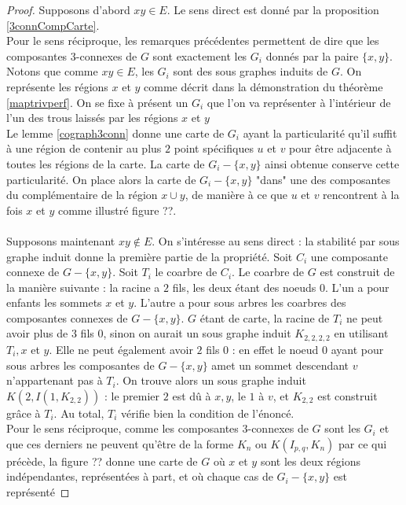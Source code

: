 \documentclass{scrartcl}
\begin{document}
\begin{flushleft}
\begin{proof}
    Supposons d'abord $xy \in E$. Le sens direct est donné par la proposition \ref{3connCompCarte}.\\
    Pour le sens réciproque, les remarques précédentes permettent de dire
    que les composantes $3$-connexes de $G$ sont exactement les $G_i$ donnés par la paire $\{x,y\}$. Notons que comme $xy \in E$, les $G_i$
    sont des sous graphes induits de $G$. On représente les régions $x$ et $y$ comme décrit dans la démonstration du théorème \ref{maptrivperf}.
    On se fixe à présent un $G_i$ que l'on va représenter à l'intérieur de l'un des trous laissés par les régions $x$ et $y$\\
    Le lemme \ref{cograph3conn} donne une carte de $G_i$ ayant la particularité qu'il suffit à une région de contenir au plus $2$ point spécifiques
    $u$ et $v$ pour être adjacente à toutes les régions de la carte. La carte de $G_i - \{x,y\}$ ainsi obtenue conserve cette particularité. On place alors
    la carte de $G_i - \{x,y\}$ "dans" une des composantes du complémentaire de la région $x \cup y$, de manière à ce que $u$ et $v$ rencontrent à la fois
    $x$ et $y$ comme illustré figure ??.
    \\~\\
    Supposons maintenant $xy \notin E$. On s'intéresse au sens direct : la stabilité par sous graphe induit donne la première partie de la propriété.
    Soit $C_i$ une composante connexe de $G - \{x,y\}$. Soit $T_i$ le coarbre de $C_i$.
    Le coarbre de $G$ est construit de la manière suivante : la racine a $2$ fils, les deux étant des noeuds $0$. L'un a pour enfants les sommets
    $x$ et $y$. L'autre a pour sous arbres les coarbres des composantes connexes de $G - \{x,y\}$. $G$ étant de carte, la racine de $T_i$
    ne peut avoir plus de $3$ fils $0$, sinon on aurait un sous graphe induit $K_{2,2,2,2}$ en utilisant $T_i, x$ et $y$. Elle ne peut également avoir $2$
    fils $0$ : en effet le noeud $0$ ayant pour sous arbres les composantes de $G - \{x,y\}$ amet un sommet descendant $v$ n'appartenant pas à $T_i$.
    On trouve alors un sous graphe induit $K(2, I(1, K_{2,2}))$ : le premier $2$ est dû à $x,y$, le $1$ à $v$, et $K_{2,2}$ est construit grâce à
    $T_i$. Au total, $T_i$ vérifie bien la condition de l'énoncé.\\
    Pour le sens réciproque, comme les composantes $3$-connexes de $G$ sont les $G_i$ et que ces derniers ne peuvent qu'être de la forme
    $K_n$ ou $K(I_{p,q}, K_n)$ par ce qui précède, la figure ?? donne une carte de $G$ où $x$ et $y$ sont les deux régions indépendantes,
    représentées à part, et où chaque cas de $G_i - \{x,y\}$ est représenté
\end{proof}


\end{flushleft}
\end{document}
